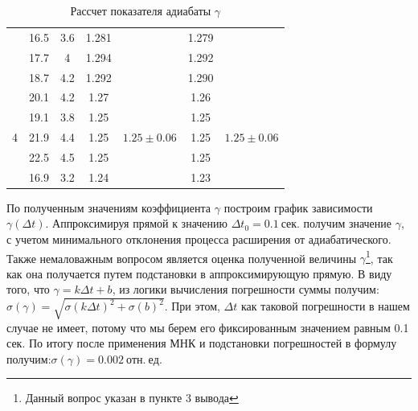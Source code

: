 \documentclass[a4paper, 12pt]{article}%
\begin{document}
\begin{table}[H]
\begin{tabular}{|c|c|c|c|c|c|c|}
			& 16.5 & 3.6 & 1.281       &                                 & 1.279                  &                               \\ \cline{2-4} \cline{6-6}
			& 17.7 & 4   & 1.294       &                                 & 1.292                  &                               \\ \cline{2-4} \cline{6-6}
			& 18.7 & 4.2 & 1.292       &                                 & 1.290                  &                               \\ \hline
			\multirow{5}{*}{4}   & 20.1 & 4.2 & 1.27        & \multirow{5}{*}{$1.25\pm 0.06$}     & 1.26                   & \multirow{5}{*}{$1.25\pm 0.06$}   \\ \cline{2-4} \cline{6-6}
			& 19.1 & 3.8 & 1.25        &                                 & 1.25                   &                               \\ \cline{2-4} \cline{6-6}
			& 21.9 & 4.4 & 1.25        &                                 & 1.25                   &                               \\ \cline{2-4} \cline{6-6}
			& 22.5 & 4.5 & 1.25        &                                 & 1.25                   &                               \\ \cline{2-4} \cline{6-6}
			& 16.9 & 3.2 & 1.24        &                                 & 1.23                   &                               \\ \hline
		\end{tabular}
		\caption{Рассчет показателя адиабаты $\gamma$}
	\end{table}
	По полученным значениям коэффициента $\gamma$ построим график зависимости $\gamma(\Delta t)$. Аппроксимируя прямой к значению $\Delta t_0 = 0.1~сек.$ получим значение $\gamma$, с учетом минимального отклонения процесса расширения от адиабатического.\\
	Также немаловажным вопросом является оценка полученной величины $\gamma$\footnote[2]{Данный вопрос указан в пункте 3 вывода}, так как она получается путем подстановки в аппроксимирующую прямую. В виду того, что $\gamma = k \Delta t + b$, из логики вычисления погрешности суммы получим:
	$\sigma (\gamma)=\sqrt{\sigma (k \Delta t)^2 + \sigma (b)^2}$. При этом, $\Delta t$ как таковой погрешности в нашем случае не имеет, потому что мы берем его фиксированным значением равным 0.1 сек. По итогу после применения МНК и подстановки погрешностей в формулу получим:$\sigma (\gamma)=0.002~отн.~ед.$\\
\end{document}
